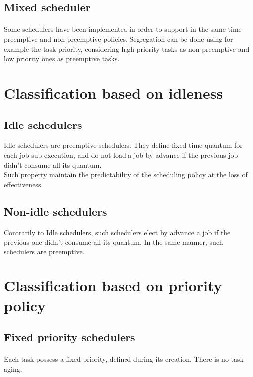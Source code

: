 \subsection{Mixed scheduler}

\paragraph{}
Some schedulers have been implemented in order to support in the same time preemptive and
non-preemptive policies. Segregation can be done using for example the task priority, considering
high priority tasks as non-preemptive and low priority ones as preemptive tasks.

\section{Classification based on idleness}

\subsection{Idle schedulers}

Idle schedulers are preemptive schedulers. They define fixed time quantum for each job
sub-execution, and do not load a job by advance if the previous job didn't consume all its
quantum.\\
Such property maintain the predictability of the scheduling policy at the loss of effectiveness.

\subsection{Non-idle schedulers}

Contrarily to Idle schedulers, such schedulers elect by advance a job if the previous one didn't
consume all its quantum. In the same manner, such schedulers are preemptive.

\section{Classification based on priority policy}

\subsection{Fixed priority schedulers}

\paragraph{}
Each task possess a fixed priority, defined during its creation. There is no task aging.

